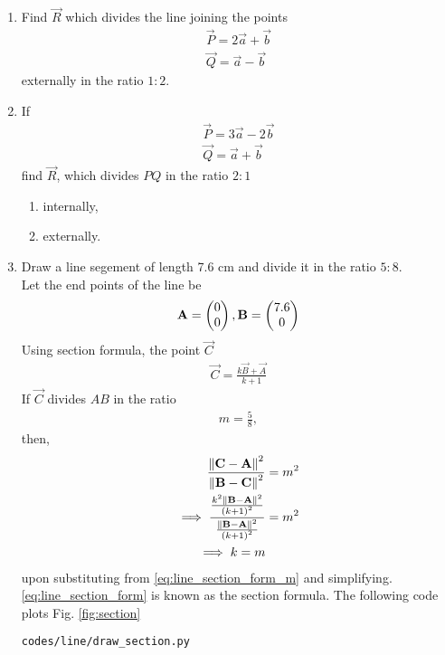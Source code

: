 \documentclass[journal,12pt,twocolumn]{IEEEtran}
\renewcommand\thesection{\arabic{section}}
\begin{document}
\begin{enumerate}[label=\thesection.\arabic*.,ref=\thesection.\theenumi]
\item Find $\vec{R}$ which divides the line joining the points 
\begin{align}
\vec{P} = 2\vec{a}+\vec{b}
\\
\vec{Q} = \vec{a}-\vec{b}
\end{align}
externally in the ratio $1:2$.
\item If 
\begin{align}
\vec{P} = 3\vec{a}-2\vec{b}
\\
\vec{Q} = \vec{a}+\vec{b}
\end{align}
%
find $\vec{R}$, which divides $PQ$ in the ratio $2:1$
\begin{enumerate}
\item internally,
\item externally.
\end{enumerate}
%
\solution
%
\item Draw a line segement of length 7.6 cm and divide it in the ratio $5:8$.
\\
\solution Let the end points of the line be 
\begin{align}
\mathbf{A} = \begin{pmatrix}0\\0\end{pmatrix}, \mathbf{B} = \begin{pmatrix}7.6\\0\end{pmatrix}
\end{align}
Using section formula, 
the point $\vec{C}$
\begin{align}
\label{eq:line_section_form}
\vec{C} = \frac{k \vec{B} + \vec{A}}{k+1}
\end{align}
If $\vec{C}$ divides $AB$ in the ratio 
\begin{align}
 m = \frac{5}{8},
\end{align}
then,
\begin{align}
\label{eq:line_section_form_m}
\frac{\left\lVert\mathbf{C}-\mathbf{A}\right\rVert^2}{\left\lVert\mathbf{B}-\mathbf{C}\right\rVert^2} &= m^2
\\
\implies \frac{\frac{k^2\left\lVert\mathbf{B}-\mathbf{A}\right\rVert^2}{\left(k+1\right)^2}}{\frac{\left\lVert\mathbf{B}-\mathbf{A}\right\rVert^2}{\left(k+1\right)^2}} &=m^2
\\
\implies k = m &
\end{align}
upon substituting from \eqref{eq:line_section_form_m} and simplifying. \eqref{eq:line_section_form} is known as the section formula.
%
The following code plots Fig. \ref{fig:section}
\begin{lstlisting}
codes/line/draw_section.py
\end{lstlisting}

\end{enumerate}
\end{document}
